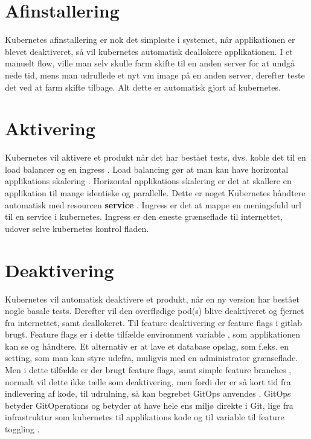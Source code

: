 \section{Afinstallering}

Kubernetes afinstallering er nok det simpleste i systemet, når applikationen er blevet deaktiveret, så vil kubernetes automatisk deallokere applikationen. I et manuelt flow, ville man selv skulle farm skifte til en anden server for at undgå nede tid, mens man udrullede et nyt vm image på en anden server, derefter teste det ved at farm skifte tilbage. Alt dette er automatisk gjort af kubernetes.

\section{Aktivering}

Kubernetes vil aktivere et produkt når det har bestået tests, dvs. koble det til en load balancer  og en ingress . Load balancing gør at man kan have horizontal applikations skalering . Horizontal applikations skalering er det at skallere en applikation til mange identiske og parallelle. Dette er noget Kubernetes håndtere automatisk med resourcen \textbf{service} . Ingress er det at mappe en meningsfuld url til en service i kubernetes. Ingress er den eneste grænseflade til internettet, udover selve kubernetes kontrol fladen.


\section{Deaktivering}

Kubernetes vil automatisk deaktivere et produkt, når en ny version har bestået nogle basale tests. Derefter vil den overflødige pod(s) blive deaktiveret og fjernet fra internettet, samt deallokeret. Til feature deaktivering er feature flags i gitlab brugt. Feature flags er i dette tilfælde environment variable , som applikationen kan se og håndtere. Et alternativ er at lave et database opslag, som f.eks. en setting, som man kan styre udefra, muligvis med en administrator grænseflade. Men i dette tilfælde er der brugt feature flags, samt simple feature branches , normalt vil dette ikke tælle som deaktivering, men fordi der er så kort tid fra indlevering af kode, til udrulning, så kan begrebet GitOps anvendes . GitOps betyder GitOperations og betyder at have hele ens miljø direkte i Git, lige fra infrastruktur som kubernetes til applikations kode og til variable til feature toggling .

